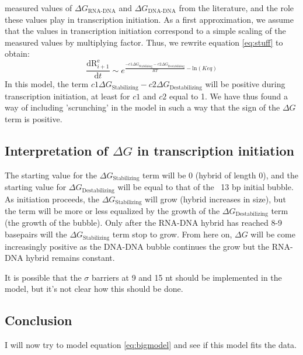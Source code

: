 \documentclass[a4paper]{article}
\newcommand{\te}[1]{\text{#1}}
\newcommand{\diff}[2]{\frac{\mathrm{d} #1}{\mathrm{d} #2}}
\begin{document}
measured values of $\Delta G_{\te{RNA-DNA}}$ and $\Delta G_{\te{DNA-DNA}}$ from
the literature, and the role these values play in transcription initiation. As
a first approximation, we assume that the values in transcription initiation
correspond to a simple scaling of the measured values by multiplying factor.
Thus, we rewrite equation \eqref{eq:stuff} to obtain:
\begin{equation}
	\diff{\te{R}_{i+1}^{\te{e}}}{t} \sim e^{\frac{-c1\Delta
	G_{\te{Stabilizing}} - c2\Delta G_{\te{Destabilizing}}}{RT} - \te{ln}(Keq)}
	\label{eq:bigmodel}
\end{equation}
In this model, the term $c1\Delta G_{\te{Stabilizing}} - c2\Delta
G_{\te{Destabilizing}}$ will be positive during
transcription initiation, at least for $c1$ and $c2$ equal to 1. We have thus
found a way of including 'scrunching' in the model in such a way that the sign
of the $\Delta G$ term is positive.

\subsection{Interpretation of $\Delta G$ in transcription initiation}
The starting value for the $\Delta G_{\te{Stabilizing}}$ term will be 0 (hybrid of
length 0), and the starting value for $\Delta G_{\te{Destabilizing}}$
will be equal to that of the ~13 bp initial bubble. As initiation proceeds, the
$\Delta G_{\te{Stabilizing}}$ will grow (hybrid increases in size), but the
term will be more or less equalized by the growth of the $\Delta
G_{\te{Destabilizing}}$ term (the growth of the bubble). Only after the RNA-DNA
hybrid has reached 8-9 basepairs will the $\Delta G_{\te{Stabilizing}}$ term
stop to grow. From here on, $\Delta G$ will be come increasingly positive as
the DNA-DNA bubble continues the grow but the RNA-DNA hybrid remains
constant.

It is possible that the $\sigma$ barriers at 9 and 15 nt should be
implemented in the model, but it's not clear how this should be done.

\subsection{Conclusion}
I will now try to model equation \eqref{eq:bigmodel} and see if this model fits
the data.

\end{document}
